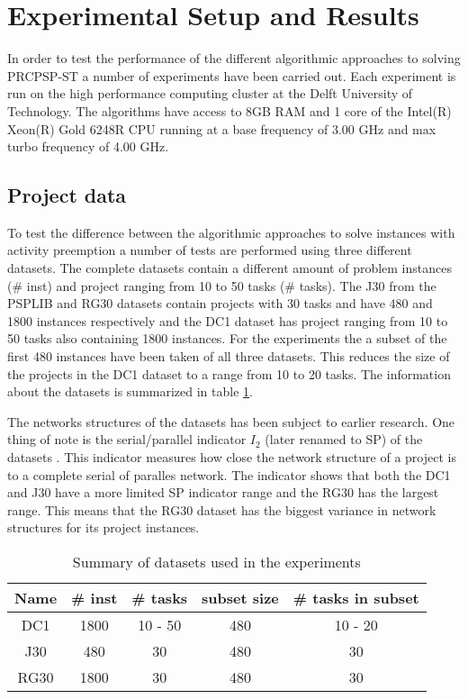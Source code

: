 \section{Experimental Setup and Results}
In order to test the performance of the different algorithmic approaches to solving PRCPSP-ST a number of experiments have been carried out.
Each experiment is run on the high performance computing cluster at the Delft University of Technology. The algorithms have access to 8GB RAM and 1 core of the Intel(R) Xeon(R) Gold 6248R CPU running at a base frequency of 3.00 GHz and max turbo frequency of 4.00 GHz.

\subsection{Project data}
To test the difference between the algorithmic approaches to solve instances with activity preemption a number of tests are performed using three different datasets. The complete datasets contain a different amount of problem instances (\# inst) and project ranging from 10 to 50 tasks (\# tasks). The J30 from the PSPLIB \cite{RN25} and RG30 datasets contain projects with 30 tasks and have 480 and 1800 instances respectively and the DC1 dataset has project ranging from 10 to 50 tasks also containing 1800 instances. For the experiments the a subset of the first 480 instances have been taken of all three datasets. This reduces the size of the projects in the DC1 dataset to a range from 10 to 20 tasks. The information about the datasets is summarized in table \ref{table:table1}.

The networks structures of the datasets has been subject to earlier research. One thing of note is the serial/parallel indicator \(I_2\) (later renamed to SP) of the datasets \cite{RN65,RN63}. This indicator measures how close the network structure of a project is to a complete serial of paralles network. The indicator shows that both the DC1 and J30 have a more limited SP indicator range and the RG30 has the largest range. This means that the RG30 dataset has the biggest variance in network structures for its project instances.

\begin{table}
	\begin{center}
		\caption{Summary of datasets used in the experiments}
		\label{table:table1}
		\begin{tabular}{ c | c c c c }
			Name & \# inst & \# tasks & subset size & \# tasks in subset \\
			\hline
			DC1 & 1800 & 10 - 50 & 480 & 10 - 20 \\
			J30 & 480 & 30 & 480 & 30 \\
			RG30 & 1800 & 30 & 480 & 30
		\end{tabular}
	\end{center}
\end{table}

